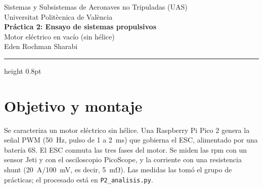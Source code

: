 \documentclass[11pt,a4paper]{article}
\begin{document}
\thispagestyle{plain}
\begin{center}
  {\small\color{gray}Sistemas y Subsistemas de Aeronaves no Tripuladas (UAS)\\
  Universitat Politècnica de València}\\[10pt]
  {\LARGE\bfseries Práctica 2: Ensayo de sistemas propulsivos}\\[6pt]
  {\large Motor eléctrico en vacío (sin hélice)}\\[10pt]
  {\large Eden Rochman Sharabi}
\end{center}
\vspace{4pt}
{\color{acento}\hrule height 0.8pt}
\vspace{6pt}

\section{Objetivo y montaje}
Se caracteriza un motor eléctrico sin hélice. Una Raspberry Pi Pico 2 genera la señal PWM (\SI{50}{\hertz}, pulso de 1 a \SI{2}{\milli\second}) que gobierna el ESC, alimentado por una batería 6S. El ESC conmuta las tres fases del motor. Se miden las rpm con un sensor Jeti y con el osciloscopio PicoScope, y la corriente con una resistencia shunt (\SI{20}{\ampere}/\SI{100}{\milli\volt}, es decir, \SI{5}{\milli\ohm}). Las medidas las tomó el grupo de prácticas; el procesado está en \texttt{P2\_analisis.py}.
\end{document}
